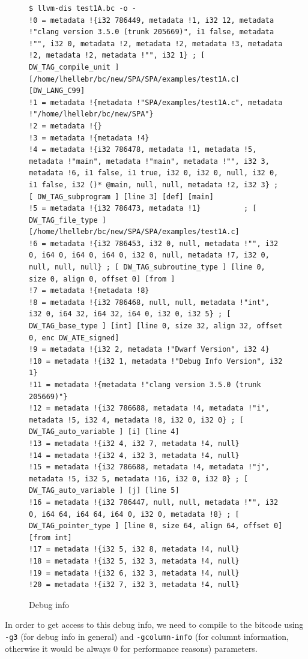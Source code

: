 \begin{figure}
\caption{Debug info}
\label{debuginfo}
\begin{lstlisting}
$ llvm-dis test1A.bc -o -
!0 = metadata !{i32 786449, metadata !1, i32 12, metadata !"clang version 3.5.0 (trunk 205669)", i1 false, metadata !"", i32 0, metadata !2, metadata !2, metadata !3, metadata !2, metadata !2, metadata !"", i32 1} ; [ DW_TAG_compile_unit ] [/home/lhellebr/bc/new/SPA/SPA/examples/test1A.c] [DW_LANG_C99]
!1 = metadata !{metadata !"SPA/examples/test1A.c", metadata !"/home/lhellebr/bc/new/SPA"}
!2 = metadata !{}
!3 = metadata !{metadata !4}
!4 = metadata !{i32 786478, metadata !1, metadata !5, metadata !"main", metadata !"main", metadata !"", i32 3, metadata !6, i1 false, i1 true, i32 0, i32 0, null, i32 0, i1 false, i32 ()* @main, null, null, metadata !2, i32 3} ; [ DW_TAG_subprogram ] [line 3] [def] [main]
!5 = metadata !{i32 786473, metadata !1}          ; [ DW_TAG_file_type ] [/home/lhellebr/bc/new/SPA/SPA/examples/test1A.c]
!6 = metadata !{i32 786453, i32 0, null, metadata !"", i32 0, i64 0, i64 0, i64 0, i32 0, null, metadata !7, i32 0, null, null, null} ; [ DW_TAG_subroutine_type ] [line 0, size 0, align 0, offset 0] [from ]
!7 = metadata !{metadata !8}
!8 = metadata !{i32 786468, null, null, metadata !"int", i32 0, i64 32, i64 32, i64 0, i32 0, i32 5} ; [ DW_TAG_base_type ] [int] [line 0, size 32, align 32, offset 0, enc DW_ATE_signed]
!9 = metadata !{i32 2, metadata !"Dwarf Version", i32 4}
!10 = metadata !{i32 1, metadata !"Debug Info Version", i32 1}
!11 = metadata !{metadata !"clang version 3.5.0 (trunk 205669)"}
!12 = metadata !{i32 786688, metadata !4, metadata !"i", metadata !5, i32 4, metadata !8, i32 0, i32 0} ; [ DW_TAG_auto_variable ] [i] [line 4]
!13 = metadata !{i32 4, i32 7, metadata !4, null}
!14 = metadata !{i32 4, i32 3, metadata !4, null}
!15 = metadata !{i32 786688, metadata !4, metadata !"j", metadata !5, i32 5, metadata !16, i32 0, i32 0} ; [ DW_TAG_auto_variable ] [j] [line 5]
!16 = metadata !{i32 786447, null, null, metadata !"", i32 0, i64 64, i64 64, i64 0, i32 0, metadata !8} ; [ DW_TAG_pointer_type ] [line 0, size 64, align 64, offset 0] [from int]
!17 = metadata !{i32 5, i32 8, metadata !4, null}
!18 = metadata !{i32 5, i32 3, metadata !4, null}
!19 = metadata !{i32 6, i32 3, metadata !4, null}
!20 = metadata !{i32 7, i32 3, metadata !4, null}
\end{lstlisting}
\end{figure}

In order to get access to this debug info, we need to compile to the bitcode using \verb|-g3| (for debug info in general) and \verb|-gcolumn-info| (for columnt information, otherwise it would be always 0 for performance reasons) parameters.
